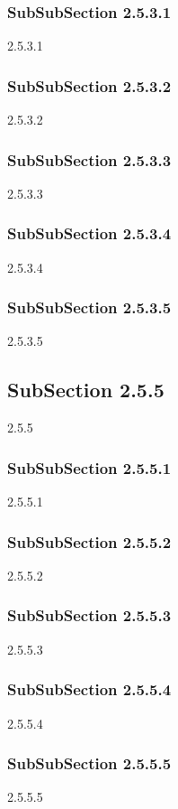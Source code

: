 \subsubsection{SubSubSection 2.5.3.1}
2.5.3.1
\subsubsection{SubSubSection 2.5.3.2}
2.5.3.2
\subsubsection{SubSubSection 2.5.3.3}
2.5.3.3
\subsubsection{SubSubSection 2.5.3.4}
2.5.3.4
\subsubsection{SubSubSection 2.5.3.5}
2.5.3.5
\subsection{SubSection 2.5.5}
2.5.5
\subsubsection{SubSubSection 2.5.5.1}
2.5.5.1
\subsubsection{SubSubSection 2.5.5.2}
2.5.5.2
\subsubsection{SubSubSection 2.5.5.3}
2.5.5.3
\subsubsection{SubSubSection 2.5.5.4}
2.5.5.4
\subsubsection{SubSubSection 2.5.5.5}
2.5.5.5